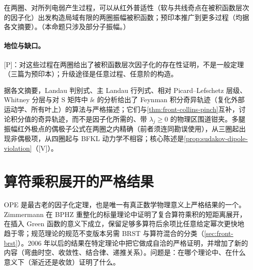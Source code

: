 \begin{proposition}\label{prop:front-local-ir}
在两圈、对所列电弱产生过程，可以从红外普适性（软与共线奇点在被积函数层次的因子化）出发构造局域有限的两圈振幅被积函数\cite{Anastasiou:2018rib,Anastasiou:2020sdt,Anastasiou:2022eym,Anastasiou:2024xvk}；预印本\cite{Anastasiou:2025cvy,Anastasiou:2026kpm,Anastasiou:2026jta}推广到更多过程（均据各文摘要）。（本命题只涉及部分子振幅。）
\end{proposition}

\paragraph{地位与缺口。}[P]：对这些过程在两圈给出了被积函数层次因子化的存在性证明，不是一般定理（三篇为预印本）；升级途径是任意过程、任意阶的构造。

\begin{remark}\label{rem:front-landau-algebraic}
据各文摘要，Landau 判别式\cite{Mizera:2021icv}、主 Landau 行列式\cite{Fevola:2023kaw,Fevola:2023fzn}、相对 Picard--Lefschetz 层级\cite{Berghoff:2022mqu}、Whitney 分层\cite{Helmer:2024wax}与对 S 矩阵中 $\ii\epsilon$ 的分析\cite{Hannesdottir:2022bmo}给出了 Feynman 积分奇异轨迹（复化外部运动学、所有叶上）的算法与严格描述；它们与\cref{thm:front-collins-pinch}互补，讨论积分值的奇异轨迹，而不是因子化所需的、带 $\lambda_j\ge0$ 的物理区围道钳夹。多腿振幅红外极点的偶极子公式在两圈之内精确\cite{Becher:2009cu,Gardi:2009qi}（前者须连同勘误使用），从三圈起出现非偶极项\cite{Almelid:2015jia}，从四圈起与 BFKL 动力学不相容\cite[第~4~节]{Caron-Huot:2013fea}；核心陈述是\cref{prop:sudakov-dipole-violation}（[V]）。
\end{remark}

\section{算符乘积展开的严格结果}\label{sec:front-ope}

OPE 是最古老的因子化定理，也是唯一有真正数学物理意义上严格结果的一个。Zimmermann 在 BPHZ 重整化的标量理论中证明了复合算符乘积的短距离展开，在插入 Green 函数的意义下成立，保留足够多算符后余项比任意给定幂次更快地趋于零\cite{Zimmermann1973}；规范理论的规范不变版本另需 BRST 与算符混合的分类（\cref{sec:front-brst}）。2006 年以后的结果在特定理论中把它做成自洽的严格证明，并增加了新的内容（弯曲时空、收敛性、结合律、递推关系）。问题是：在哪个理论中、在什么意义下（渐近还是收敛）证明了什么。

